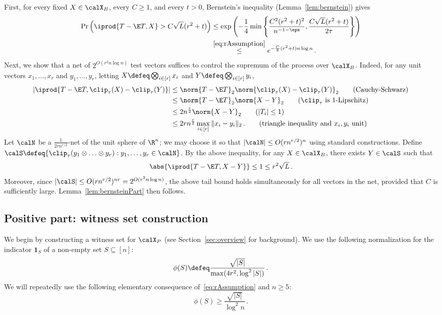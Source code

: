 \documentclass[11pt,a4paper]{article}
\begin{document}
First,
for every fixed $X\in \calX_B$, every $C\geq 1$, and
every $t>0$, Bernstein's inequality (Lemma~\ref{lem:bernstein}) gives
\begin{align*}
    \Pr\left(\iprod{T - \E T, X}> C\sqrt L(r^2+t)\right)
    &\le
    \exp\left(
        -\frac 14 \min\left\{
            \frac {C^2(r^2+t)^2} {n^{-1-\eps}},
            \frac{C \sqrt L(r^2+t)} {2\tau}
        \right\}
    \right)\nonumber\\
    &\overset{\eqref{eq:rAssumption}}\le e^{-\frac C 8 (r^2+t) n\log n}\,.
\end{align*}
Next, we show that a net of $2^{O(r^2 n\log n)}$ test vectors suffices to control the supremum of the process over $\calX_B$. Indeed, for any
unit vectors $x_1, \ldots, x_r$
and $y_1, \ldots, y_r$, letting
$X \defeq \bigotimes_{i\in [r]} x_i$
and $Y \defeq \bigotimes_{i\in [r]} y_i$,
\begin{align*}
    \left|
    \iprod{T - \E T, \clip_\tau(X) - \clip_\tau(Y)}
    \right|
    &\le \norm{T - \E T}_2
    \norm{\clip_\tau(X) - \clip_\tau(Y)}_2\tag*{(Cauchy-Schwarz)} \\
    &\le \norm{T - \E T}_2 \norm{X-Y}_2 \tag*{($\clip_\tau$ is 1-Lipschitz)}\\
    &\le 2 n^{\frac r2} \norm{X-Y}_2 \tag*{($|T_i|\le 1$)}\\
    &\le 2rn^{\frac r2}
    \max_{i\in [r]} \|x_i-y_i\|_2\,. \tag*{(triangle inequality and $x_i,y_i$ unit)} 
\end{align*}
Let $\calN$ be a $\frac 1 {2r n^{r/2}}$-net of the unit sphere of $\R^n$; we
may choose it so that $|\calN|\le O(rn^{r/2})^n$ using standard constructions. Define $\calS \defeq \{\clip_\tau(y_1 \otimes \ldots\otimes y_r) : y_1, \ldots, y_r\in \calN\}$.
By the above inequality, for any $X\in \calX_B$, there exists $Y\in \calS$ such that
\[
    \abs{\iprod{T - \E T, X - Y}}\le 1\le r^2 \sqrt L\,.
\]
Moreover, since $|\calS|\le O(rn^{r/2})^{nr}= 2^{O(r^2 n \log n)}$, 
the above tail bound holds simultaneously
for all vectors in the net, provided that $C$ is sufficiently large. Lemma~\ref{lem:bernsteinPart}
then follows.


\subsection{Positive part: witness set construction}

We begin by constructing a witness
set for $\calX_P$ (see Section~\ref{sec:overview} for background). We
use the following
normalization for the indicator $\mathbf 1_S$
of a non-empty set $S\subseteq [n]$:
\[
    \phi(S) \defeq \frac {\sqrt{|S|}} {\max(4r^2, \log^2|S|)}\,.
\]
We will repeatedly use the following elementary consequence of~\eqref{eq:rAssumption} and $n\ge 5$:
\begin{equation}
    \phi(S)\ge \frac {\sqrt {|S|}}{\log^2 n}\,.\label{eq:lowerBoundPhi}
\end{equation}
\end{document}

